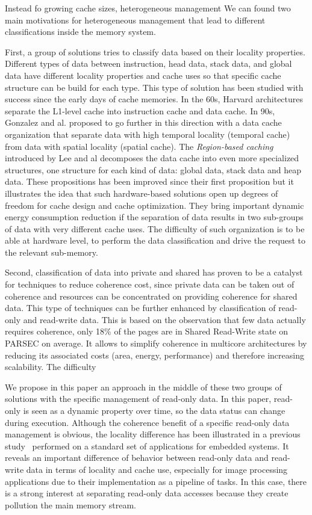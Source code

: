 \documentclass[sigconf]{acmart}
\begin{document}
Instead fo growing cache sizes, heterogeneous management
We can found two main motivations for heterogeneous management that lead to different classifications inside the memory system.

First, a group of solutions tries to classify data based on their locality properties. Different types of data between instruction, head data, stack data, and global data have different locality properties and cache uses so that specific cache structure can be build for each type. This type of solution has been studied with success since the early days of cache memories. In the 60s, Harvard architectures separate the L1-level cache into instruction cache and data cache. In 90s, Gonzalez and al.\cite{Gonzalez:1995} proposed to go further in this direction with a data cache organization that separate data with high temporal locality (temporal cache) from data with spatial locality (spatial cache). The \textit{Region-based caching} introduced by Lee and al\cite{Lee:2000} decomposes the data cache into even more specialized structures, one structure for each kind of data: global data, stack data and heap data. These propositions has been improved since their first proposition but it illustrates the idea that such hardware-based solutions open up degrees of freedom for cache design and cache optimization. They bring important dynamic energy consumption reduction if the separation of data results in two sub-groups of data with very different cache uses. The difficulty of such organization is to be able at hardware level, to perform the data classification and drive the request to the relevant sub-memory. 

Second, classification of data into private and shared has proven to be a catalyst for techniques to reduce coherence cost, since private data can be taken out of coherence and resources can be concentrated on providing coherence for shared data. This type of techniques can be further enhanced by classification of read-only and read-write data. This is based on the observation that few data actually requires coherence, only 18\% of the pages are in Shared Read-Write state on PARSEC on average\cite{Cuesta:2013}. It allows to simplify coherence in multicore architectures by reducing its associated costs (area, energy, performance) and therefore increasing scalability. 
The difficulty 

We propose in this paper an approach in the middle of these two groups of solutions with the specific management of read-only data. In this paper, read-only is seen as a dynamic property over time, so the data status can change during execution. Although the coherence benefit of a specific read-only data management is obvious, the locality difference has been illustrated in a previous study~\cite{vaumourin:2014} performed on a standard set of applications for embedded systems. It reveals an important difference of behavior between read-only data and read-write data in terms of locality and cache use, especially for image processing applications due to their implementation as a pipeline of tasks. In this case, there is a strong interest at separating read-only data accesses because they create pollution the main memory stream.
\end{document}

